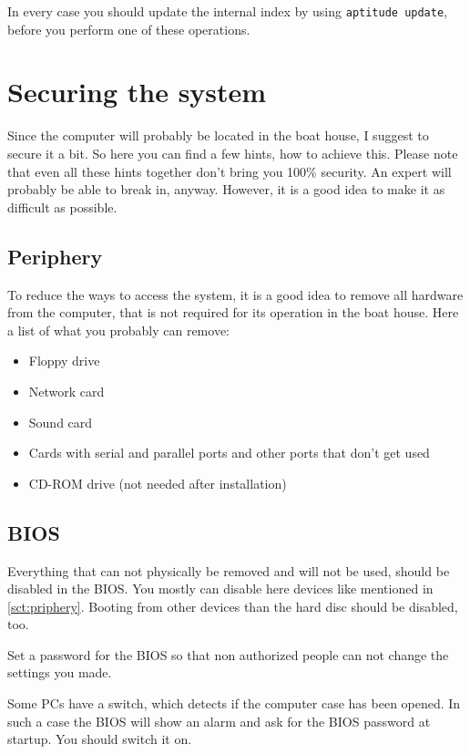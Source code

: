 \documentclass[a4paper,12pt,twoside]{article}
\begin{document}
In every case you should update the internal index by using
\texttt{aptitude update}, before you perform one
of these operations.


\section{Securing the system}
\label{sct:system_secure}
Since the computer will probably be
located in the boat house, I suggest to secure it a bit. So here you
can find a few hints, how to achieve this. Please note that even all
these hints together don't bring you 100\% security.
An expert will probably be able to break in, anyway. However, it is a
good idea to make it as difficult as possible.


\subsection{Periphery}
\label{sct:periphery}
To reduce the ways to access the system,
it is a good idea to remove all hardware from the computer, that is not
required for its operation in the boat house. Here a list of what you
probably can remove:

\begin{itemize}
    \item Floppy drive
    \item Network card
    \item Sound card
    \item Cards with serial and parallel ports and other ports that
        don't get used
    \item CD-ROM drive (not needed after installation)
\end{itemize}


\subsection{BIOS}
\label{sct:bios}
Everything that can not physically be removed and will not be used,
should be disabled in the BIOS. You mostly can disable here devices
like mentioned in \ref{sct:priphery}. Booting from other devices than 
the hard disc should be disabled, too.

Set a password for the BIOS so that non authorized people can not change
the settings you made.

Some PCs have a switch, which detects if the computer case has been
opened. In such a case the BIOS will show an alarm and ask for the BIOS
password at startup. You should switch it on.
\end{document}
